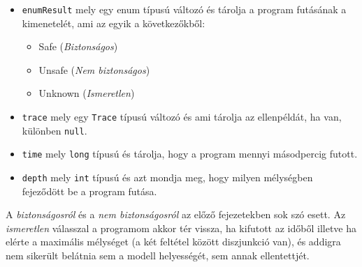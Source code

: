 \begin{itemize}
	\item \verb+enumResult+ mely egy enum típusú változó és tárolja a program futásának a kimenetelét, ami az egyik a következőkből:
	\begin{itemize}
		\item Safe (\emph{Biztonságos})
		\item Unsafe (\emph{Nem biztonságos})
		\item Unknown (\emph{Ismeretlen})
	\end{itemize}
	\item \verb+trace+ mely egy \verb+Trace+ típusú változó és ami tárolja az ellenpéldát, ha van, különben \verb+null+.
	\item \verb+time+ mely \verb+long+ típusú és tárolja, hogy a program mennyi másodpercig futott.
	\item \verb+depth+ mely \verb+int+ típusú és azt mondja meg, hogy milyen mélységben fejeződött be a program futása.
\end{itemize}

A \textit{biztonságosról} és a \textit{nem biztonságosról} az előző fejezetekben sok szó esett. Az \textit{ismeretlen} válasszal a programom akkor tér vissza, ha kifutott az időből illetve ha elérte a maximális mélységet (a két feltétel között diszjunkció van), és addigra nem sikerült belátnia sem a modell helyességét, sem annak ellentettjét.